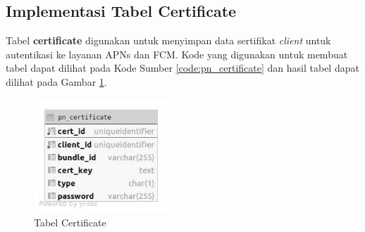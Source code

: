 %

\subsection{Implementasi Tabel Certificate}
\par Tabel \textbf{certificate} digunakan untuk menyimpan data sertifikat \textit{client} untuk autentikasi ke layanan APNs dan FCM. Kode yang digunakan untuk membuat tabel dapat dilihat pada Kode Sumber \ref{code:pn_certificate} dan hasil tabel dapat dilihat pada Gambar \ref{tabel_pn_certificate}.

\clearpage
\begin{figure}[H]
    \centering\includegraphics[width=0.45\textwidth]{bab4/figures/tabel_pn_certificate.jpg}
    \caption{Tabel Certificate}
    \label{tabel_pn_certificate}
\end{figure}

